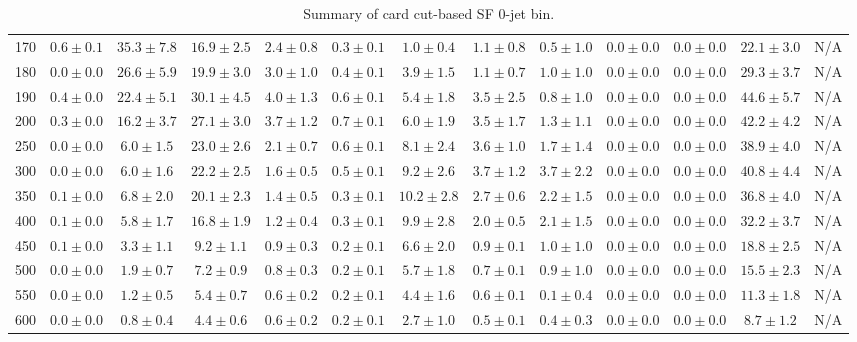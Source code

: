\begin{table}
{\begin{center}
\begin{tabular}{l | c c | c c c c c c c c  | c c}
170 & $0.6\pm0.1$ & $35.3\pm7.8$ & $16.9\pm2.5$ & $2.4\pm0.8$ & $0.3\pm0.1$ & $1.0\pm0.4$ & $1.1\pm0.8$ & $0.5\pm1.0$ & $0.0\pm0.0$ & $0.0\pm0.0$ & $22.1\pm3.0$ & N/A \\
180 & $0.0\pm0.0$ & $26.6\pm5.9$ & $19.9\pm3.0$ & $3.0\pm1.0$ & $0.4\pm0.1$ & $3.9\pm1.5$ & $1.1\pm0.7$ & $1.0\pm1.0$ & $0.0\pm0.0$ & $0.0\pm0.0$ & $29.3\pm3.7$ & N/A \\
190 & $0.4\pm0.0$ & $22.4\pm5.1$ & $30.1\pm4.5$ & $4.0\pm1.3$ & $0.6\pm0.1$ & $5.4\pm1.8$ & $3.5\pm2.5$ & $0.8\pm1.0$ & $0.0\pm0.0$ & $0.0\pm0.0$ & $44.6\pm5.7$ & N/A \\
200 & $0.3\pm0.0$ & $16.2\pm3.7$ & $27.1\pm3.0$ & $3.7\pm1.2$ & $0.7\pm0.1$ & $6.0\pm1.9$ & $3.5\pm1.7$ & $1.3\pm1.1$ & $0.0\pm0.0$ & $0.0\pm0.0$ & $42.2\pm4.2$ & N/A \\
250 & $0.0\pm0.0$ & $6.0\pm1.5$ & $23.0\pm2.6$ & $2.1\pm0.7$ & $0.6\pm0.1$ & $8.1\pm2.4$ & $3.6\pm1.0$ & $1.7\pm1.4$ & $0.0\pm0.0$ & $0.0\pm0.0$ & $38.9\pm4.0$ & N/A \\
300 & $0.0\pm0.0$ & $6.0\pm1.6$ & $22.2\pm2.5$ & $1.6\pm0.5$ & $0.5\pm0.1$ & $9.2\pm2.6$ & $3.7\pm1.2$ & $3.7\pm2.2$ & $0.0\pm0.0$ & $0.0\pm0.0$ & $40.8\pm4.4$ & N/A \\
350 & $0.1\pm0.0$ & $6.8\pm2.0$ & $20.1\pm2.3$ & $1.4\pm0.5$ & $0.3\pm0.1$ & $10.2\pm2.8$ & $2.7\pm0.6$ & $2.2\pm1.5$ & $0.0\pm0.0$ & $0.0\pm0.0$ & $36.8\pm4.0$ & N/A \\
400 & $0.1\pm0.0$ & $5.8\pm1.7$ & $16.8\pm1.9$ & $1.2\pm0.4$ & $0.3\pm0.1$ & $9.9\pm2.8$ & $2.0\pm0.5$ & $2.1\pm1.5$ & $0.0\pm0.0$ & $0.0\pm0.0$ & $32.2\pm3.7$ & N/A \\
450 & $0.1\pm0.0$ & $3.3\pm1.1$ & $9.2\pm1.1$ & $0.9\pm0.3$ & $0.2\pm0.1$ & $6.6\pm2.0$ & $0.9\pm0.1$ & $1.0\pm1.0$ & $0.0\pm0.0$ & $0.0\pm0.0$ & $18.8\pm2.5$ & N/A \\
500 & $0.0\pm0.0$ & $1.9\pm0.7$ & $7.2\pm0.9$ & $0.8\pm0.3$ & $0.2\pm0.1$ & $5.7\pm1.8$ & $0.7\pm0.1$ & $0.9\pm1.0$ & $0.0\pm0.0$ & $0.0\pm0.0$ & $15.5\pm2.3$ & N/A \\
550 & $0.0\pm0.0$ & $1.2\pm0.5$ & $5.4\pm0.7$ & $0.6\pm0.2$ & $0.2\pm0.1$ & $4.4\pm1.6$ & $0.6\pm0.1$ & $0.1\pm0.4$ & $0.0\pm0.0$ & $0.0\pm0.0$ & $11.3\pm1.8$ & N/A \\
600 & $0.0\pm0.0$ & $0.8\pm0.4$ & $4.4\pm0.6$ & $0.6\pm0.2$ & $0.2\pm0.1$ & $2.7\pm1.0$ & $0.5\pm0.1$ & $0.4\pm0.3$ & $0.0\pm0.0$ & $0.0\pm0.0$ & $8.7\pm1.2$ & N/A \\
\hline
\end{tabular}
\end{center}
}
\caption{Summary of card cut-based SF 0-jet bin.}
\end{table}
